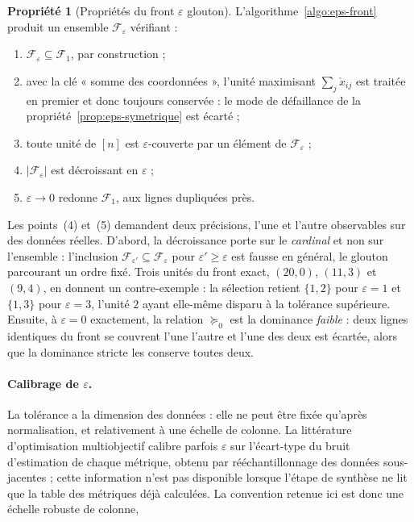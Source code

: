 \documentclass[11pt,a4paper]{article}
\theoremstyle{definition}
\newtheorem{propriete}{Propriété}[section]
\theoremstyle{remark}
\newcommand{\abs}[1]{\left\lvert #1 \right\rvert}
\begin{document}
\bigskip

\begin{propriete}[Propriétés du front $\varepsilon$ glouton]
  \label{prop:eps-front}
  L'algorithme~\ref{algo:eps-front} produit un ensemble
  $\mathcal{F}_\varepsilon$ vérifiant :

  \medskip

  \begin{enumerate}[nosep,leftmargin=1.8em]
    \item $\mathcal{F}_\varepsilon \subseteq \mathcal{F}_1$, par construction ;
    \item avec la clé « somme des coordonnées », l'unité maximisant
    $\sum_j \mathring{x}_{ij}$ est traitée en premier et donc toujours conservée : le mode
    de défaillance de la propriété~\ref{prop:eps-symetrique} est écarté ;
    \item toute unité de $[n]$ est $\varepsilon$-couverte par un élément de
    $\mathcal{F}_\varepsilon$ ;
    \item $\abs{\mathcal{F}_\varepsilon}$ est décroissant en $\varepsilon$ ;
    \item $\varepsilon \to 0$ redonne $\mathcal{F}_1$, aux lignes dupliquées près.
  \end{enumerate}
\end{propriete}

\bigskip

Les points~(4) et~(5) demandent deux précisions, l'une et l'autre observables sur des
données réelles. D'abord, la décroissance porte sur le \emph{cardinal} et non sur
l'ensemble : l'inclusion $\mathcal{F}_{\varepsilon'} \subseteq \mathcal{F}_{\varepsilon}$
pour $\varepsilon' \ge \varepsilon$ est fausse en général, le glouton parcourant un ordre
fixé. Trois unités du front exact, $(20,0)$, $(11,3)$ et $(9,4)$, en donnent un
contre-exemple : la sélection retient $\{1,2\}$ pour $\varepsilon = 1$ et $\{1,3\}$ pour
$\varepsilon = 3$, l'unité $2$ ayant elle-même disparu à la tolérance supérieure.
Ensuite, à $\varepsilon = 0$ exactement, la relation $\succeq_0$ est la dominance
\emph{faible} : deux lignes identiques du front se couvrent l'une l'autre et l'une des
deux est écartée, alors que la dominance stricte les conserve toutes deux.

\bigskip

\paragraph{Calibrage de $\varepsilon$.} La tolérance a la dimension des données : elle ne
peut être fixée qu'après normalisation, et relativement à une échelle de colonne. La
littérature d'optimisation multiobjectif calibre parfois $\varepsilon$ sur l'écart-type
du bruit d'estimation de chaque métrique, obtenu par rééchantillonnage des données
sous-jacentes ; cette information n'est pas disponible lorsque l'étape de synthèse ne lit
que la table des métriques déjà calculées. La convention retenue ici est donc une échelle
robuste de colonne,
\end{document}
